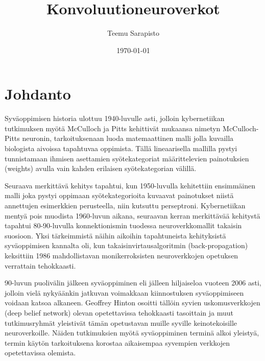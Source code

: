 \documentclass[finnish]{tktltiki2}
\title{Konvoluutioneuroverkot}
\author{Teemu Sarapisto}
\date{\today}
\theoremstyle{definition}
\theoremstyle{remark}
\begin{document}

  \frontmatter      %

  \maketitle        %
  \makeabstract     %

  \tableofcontents  %


  \mainmatter       %

  \section{Johdanto}
   Syväoppimisen historia ulottuu 1940-luvulle asti, jolloin kybernetiikan tutkimuksen myötä McCulloch ja Pitts kehittivät mukaansa nimetyn McCulloch-Pitts neuronin, tarkoituksenaan luoda matemaattinen malli jolla kuvailla biologista aivoissa tapahtuvaa oppimista. Tällä lineaarisella mallilla pystyi tunnistamaan ihmisen asettamien syötekategoriat määrittelevien painotuksien (weights) avulla vain kahden erilaisen syötekategorian välillä. 
  
  Seuraava merkittävä kehitys tapahtui, kun 1950-luvulla kehitettiin ensimmäinen malli joka pystyi oppimaan syötekategorioita kuvaavat painotukset niistä annettujen esimerkkien perusteella, niin kutsuttu perseptroni.  
  Kybernetiikan mentyä pois muodista 1960-luvun aikana, seuraavan kerran merkittävää kehitystä tapahtui 80-90-luvulla konnektionismin tuodessa neuroverkkomallit takaisin suosioon. Yksi tärkeimmistä näihin aikoihin tapahtuneista kehityksistä syväoppimisen kannalta oli, kun takaisinvirtausalgoritmin (back-propagation) keksittiin 1986 mahdollistavan monikerroksisten neuroverkkojen opetuksen verrattain tehokkaasti.

  90-luvun puolivälin jälkeen syväoppiminen eli jälleen hiljaiseloa vuoteen 2006 asti, jolloin vielä nykyäänkin jatkuvan voimakkaan kiinnostuksen syväoppimiseen voidaan katsoa alkaneen. Geoffrey Hinton osoitti tällöin syvien uskomusverkkojen (deep belief network) olevan opetettavissa tehokkaasti tasoittain ja muut tutkimusryhmät yleistivät tämän opetustavan muille syville keinotekoisille neuroverkoille. Näiden tutkimuksien myötä syväoppiminen terminä alkoi yleistyä, termin käytön tarkoituksena korostaa aikaisempaa syvempien verkkojen opetettavissa olemista. 
\end{document}
